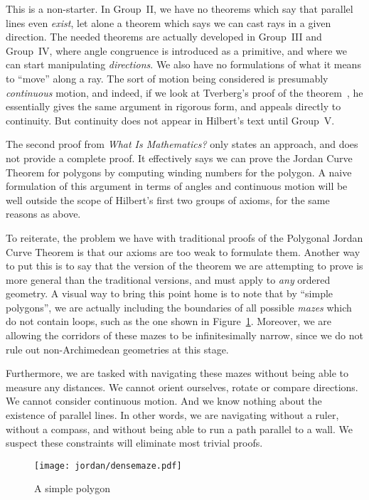 This is a non-starter. In Group~II, we have no theorems which say that parallel lines even \emph{exist}, let alone a theorem which says we can cast rays in a given direction. The needed theorems are actually developed in Group~III and Group~IV, where angle congruence is introduced as a primitive, and where we can start manipulating \emph{directions}. We also have no formulations of what it means to ``move'' along a ray. The sort of motion being considered is presumably \emph{continuous} motion, and indeed, if we look at Tverberg's proof of the theorem~\cite{TverbergJordan}, he essentially gives the same argument in rigorous form, and appeals directly to continuity. But  continuity does not appear in Hilbert's text until Group~V. 

The second proof from \emph{What Is Mathematics?} only states an approach, and does not provide a complete proof. It effectively says we can prove the Jordan Curve Theorem for polygons by computing winding numbers for the polygon. A naive formulation of this argument in terms of angles and continuous motion will be well outside the scope of Hilbert's first two groups of axioms, for the same reasons as above. 

To reiterate, the problem we have with traditional proofs of the Polygonal Jordan Curve Theorem is that our axioms are too weak to formulate them. Another way to put this is to say that the version of the theorem we are attempting to prove is more general than the traditional versions, and must apply to \emph{any} ordered geometry. A visual way to bring this point home is to note that by ``simple polygons'', we are actually including the boundaries of all possible \emph{mazes} which do not contain loops, such as the one shown in Figure~\ref{fig:SimplePolygon}. Moreover, we are allowing the corridors of these mazes to be infinitesimally narrow, since we do not rule out non-Archimedean geometries at this stage.

Furthermore, we are tasked with navigating these mazes without being able to measure any distances. We cannot orient ourselves, rotate or compare directions. We cannot consider continuous motion. And we know nothing about the existence of parallel lines. In other words, we are navigating without a ruler, without a compass, and without being able to run a path parallel to a wall. We suspect these constraints will eliminate most trivial proofs.

\begin{figure}
\centering
\texttt{[image: jordan/densemaze.pdf]}
\caption{A simple polygon}
\label{fig:SimplePolygon}
\end{figure}

